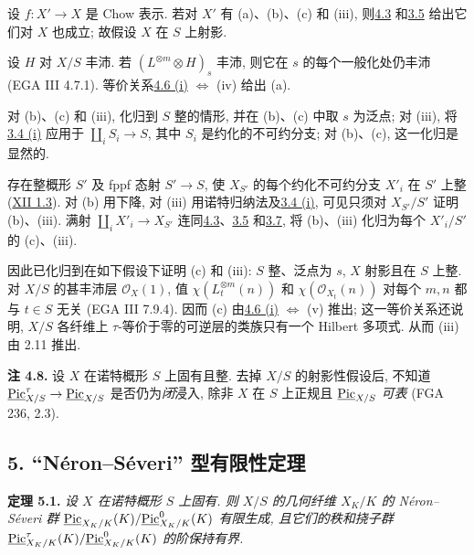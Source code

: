 设 \(f:X'\to X\) 是 Chow 表示. 若对 \(X'\) 有 (a)、(b)、(c) 和 (iii), 则\hyperlink{sga6.e13.lem.4-3}{4.3} 和\hyperlink{sga6.e13.thm.3-5}{3.5} 给出它们对 \(X\) 也成立; 故假设 \(X\) 在 \(S\) 上射影.

设 \(H\) 对 \(X/S\) 丰沛. 若 \((L^{\otimes m}\otimes H)_s\) 丰沛, 则它在 \(s\) 的每个一般化处仍丰沛 (EGA III 4.7.1). 等价关系\hyperlink{sga6.e13.thm.4-6}{4.6 (i)} \(\Longleftrightarrow\) (iv) 给出 (a).

对 (b)、(c) 和 (iii), 化归到 \(S\) 整的情形, 并在 (b)、(c) 中取 \(s\) 为泛点; 对 (iii), 将\hyperlink{sga6.e13.lem.3-4}{3.4 (i)} 应用于 \(\coprod_iS_i\to S\), 其中 \(S_i\) 是约化的不可约分支; 对 (b)、(c), 这一化归是显然的.

存在整概形 \(S'\) 及 fppf 态射 \(S'\to S\), 使 \(X_{S'}\) 的每个约化不可约分支 \(X'_i\) 在 \(S'\) 上整 (\hyperlink{sga6.e12.lem.1-3}{XII 1.3}). 对 (b) 用下降, 对 (iii) 用诺特归纳法及\hyperlink{sga6.e13.lem.3-4}{3.4 (i)}, 可见只须对 \(X_{S'}/S'\) 证明 (b)、(iii). 满射 \(\coprod_iX'_i\to X_{S'}\) 连同\hyperlink{sga6.e13.lem.4-3}{4.3}、\hyperlink{sga6.e13.thm.3-5}{3.5} 和\hyperlink{sga6.e13.lem.3-7}{3.7}, 将 (b)、(iii) 化归为每个 \(X'_i/S'\) 的 (c)、(iii).

因此已化归到在如下假设下证明 (c) 和 (iii): \(S\) 整、泛点为 \(s\), \(X\) 射影且在 \(S\) 上整. 对 \(X/S\) 的甚丰沛层 \(\mathcal O_X(1)\), 值 \(\chi(L_t^{\otimes m}(n))\) 和 \(\chi(\mathcal O_{X_t}(n))\) 对每个 \(m,n\) 都与 \(t\in S\) 无关 (EGA III 7.9.4). 因而 (c) 由\hyperlink{sga6.e13.thm.4-6}{4.6 (i)} \(\Longleftrightarrow\) (v) 推出; 这一等价关系还说明, \(X/S\) 各纤维上 \(\tau\)-等价于零的可逆层的类族只有一个 Hilbert 多项式. 从而 (iii) 由 2.11 推出.

\textbf{注 4.8.} 设 \(X\) 在诺特概形 \(S\) 上固有且整. 去掉 \(X/S\) 的射影性假设后, 不知道 \(\underline{\operatorname{Pic}}^{\tau}_{X/S}\to\underline{\operatorname{Pic}}_{X/S}\) 是否仍为\emph{闭}浸入, 除非 \(X\) 在 \(S\) 上正规且 \(\underline{\operatorname{Pic}}_{X/S}\) \emph{可表} (FGA 236, 2.3).

\subsection*{5. ``N\'eron--S\'everi'' 型有限性定理}

\textbf{定理 5.1.} \emph{设 \(X\) 在诺特概形 \(S\) 上固有. 则 \(X/S\) 的几何纤维 \(X_K/K\) 的 N\'eron--S\'everi 群 \(\underline{\operatorname{Pic}}_{X_K/K}(K)/\underline{\operatorname{Pic}}^0_{X_K/K}(K)\) 有限生成, 且它们的秩和挠子群 \(\underline{\operatorname{Pic}}^\tau_{X_K/K}(K)/\underline{\operatorname{Pic}}^0_{X_K/K}(K)\) 的阶保持有界.}

